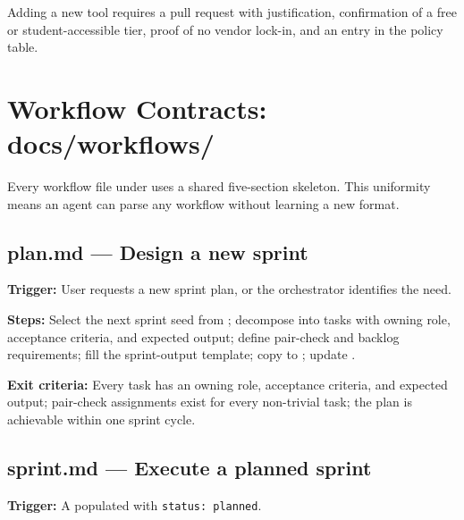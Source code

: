 \documentclass[a4paper,11pt,openany]{report}
\begin{document}
Adding a new tool requires a pull request with justification, confirmation of a
free or student-accessible tier, proof of no vendor lock-in, and an entry in the
policy table.



\chapter{Workflow Contracts: docs/workflows/}
\label{ch:workflows}


Every workflow file under  uses a shared five-section
skeleton. This uniformity means an agent can parse any workflow without
learning a new format.

\section{plan.md --- Design a new sprint}

\textbf{Trigger:} User requests a new sprint plan, or the orchestrator
identifies the need.

\textbf{Steps:} Select the next sprint seed from
; decompose into tasks with owning role, acceptance
criteria, and expected output; define pair-check and backlog requirements; fill
the sprint-output template; copy to ; update
.

\textbf{Exit criteria:} Every task has an owning role, acceptance criteria, and
expected output; pair-check assignments exist for every non-trivial task; the
plan is achievable within one sprint cycle.

\section{sprint.md --- Execute a planned sprint}

\textbf{Trigger:} A populated  with
\texttt{status: planned}.
\end{document}
